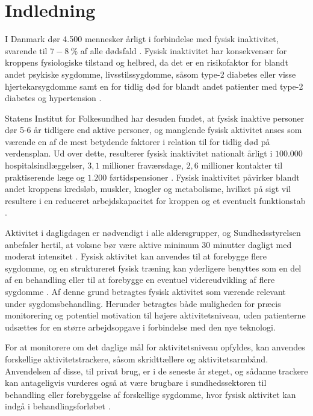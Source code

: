 \chapter{Indledning} \label{sec:indledning}
I Danmark dør 4.500 mennesker årligt i forbindelse med fysisk inaktivitet, svarende til $7-8~\%$ af alle dødsfald \citep{aagaard2014}. Fysisk inaktivitet har konsekvenser for kroppens fysiologiske tilstand og helbred, da det er en risikofaktor for blandt andet psykiske sygdomme, livsstilssygdomme, såsom type-2 diabetes eller visse hjertekarsygdomme samt en for tidlig død for blandt andet patienter med type-2 diabetes og hypertension \citep{motionsraad2007}. 

Statens Institut for Folkesundhed har desuden fundet, at fysisk inaktive personer dør 5-6 år tidligere end aktive personer, og manglende fysisk aktivitet anses som værende en af de mest betydende faktorer i relation til for tidlig død på verdensplan. Ud over dette, resulterer fysisk inaktivitet nationalt årligt i $100.000$ hospitalsindlæggelser, $3,1$ millioner fraværsdage, $2,6$ millioner kontakter til praktiserende læge og $1.200$ førtidspensioner \citep{christensen2012}. Fysisk inaktivitet påvirker blandt andet kroppens kredsløb, muskler, knogler og metabolisme, hvilket på sigt vil resultere i en reduceret arbejdskapacitet for kroppen og et eventuelt funktionstab \citep{motionsraad2007}.

Aktivitet i dagligdagen er nødvendigt i alle aldersgrupper, og Sundhedsstyrelsen anbefaler hertil, at voksne bør være aktive minimum 30 minutter dagligt med moderat intensitet \citep{pedersen2011}. Fysisk aktivitet kan anvendes til at forebygge flere sygdomme, og en struktureret fysisk træning kan yderligere benyttes som en del af en behandling eller til at forebygge en eventuel videreudvikling af flere sygdomme \citep{motionsraad2007}. Af denne grund betragtes fysisk aktivitet som værende relevant under sygdomsbehandling. Herunder betragtes både muligheden for præcis monitorering og potentiel motivation til højere aktivitetsniveau, uden patienterne udsættes for en større arbejdsopgave i forbindelse med den nye teknologi.

For at monitorere om det daglige mål for aktivitetsniveau opfyldes, kan anvendes forskellige aktivitetstrackere, såsom skridttællere og aktivitetsarmbånd. Anvendelsen af disse, til privat brug, er i de seneste år steget, og sådanne trackere kan antageligvis vurderes også at være brugbare i sundhedssektoren til behandling eller forebyggelse af forskellige sygdomme, hvor fysisk aktivitet kan indgå i behandlingsforløbet \citep{statista2016}.

